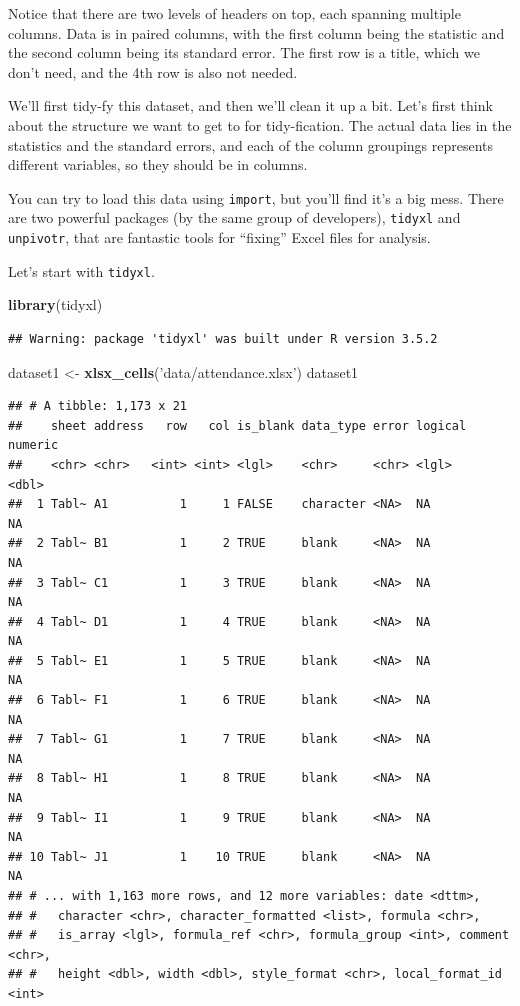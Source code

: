 \documentclass[12pt,letterpaperpaper,openany]{book}
\newenvironment{Shaded}{\begin{snugshade}}{\end{snugshade}}
\newcommand{\KeywordTok}[1]{\textcolor[rgb]{0.13,0.29,0.53}{\textbf{#1}}}
\newcommand{\NormalTok}[1]{#1}
\newcommand{\StringTok}[1]{\textcolor[rgb]{0.31,0.60,0.02}{#1}}
\begin{document}
Notice that there are two levels of headers on top, each spanning multiple columns.
Data is in paired columns, with the first column being the statistic and the second column
being its standard error. The first row is a title, which we don't need, and the
4th row is also not needed.

We'll first tidy-fy this dataset, and then we'll clean it up a bit. Let's first
think about the structure we want to get to for tidy-fication. The actual data lies in
the statistics and the standard errors, and each of the column groupings represents different
variables, so they should be in columns.

You can try to load this data using \texttt{import}, but you'll find it's a big mess.
There are two powerful packages (by the same group of developers), \texttt{tidyxl} and
\texttt{unpivotr}, that are fantastic tools for ``fixing'' Excel files for analysis.

Let's start with \texttt{tidyxl}.

\begin{Shaded}
\begin{Highlighting}[]
\KeywordTok{library}\NormalTok{(tidyxl)}
\end{Highlighting}
\end{Shaded}

\begin{verbatim}
## Warning: package 'tidyxl' was built under R version 3.5.2
\end{verbatim}

\begin{Shaded}
\begin{Highlighting}[]
\NormalTok{dataset1 <-}\StringTok{ }\KeywordTok{xlsx_cells}\NormalTok{(}\StringTok{'data/attendance.xlsx'}\NormalTok{)}
\NormalTok{dataset1}
\end{Highlighting}
\end{Shaded}

\begin{verbatim}
## # A tibble: 1,173 x 21
##    sheet address   row   col is_blank data_type error logical numeric
##    <chr> <chr>   <int> <int> <lgl>    <chr>     <chr> <lgl>     <dbl>
##  1 Tabl~ A1          1     1 FALSE    character <NA>  NA           NA
##  2 Tabl~ B1          1     2 TRUE     blank     <NA>  NA           NA
##  3 Tabl~ C1          1     3 TRUE     blank     <NA>  NA           NA
##  4 Tabl~ D1          1     4 TRUE     blank     <NA>  NA           NA
##  5 Tabl~ E1          1     5 TRUE     blank     <NA>  NA           NA
##  6 Tabl~ F1          1     6 TRUE     blank     <NA>  NA           NA
##  7 Tabl~ G1          1     7 TRUE     blank     <NA>  NA           NA
##  8 Tabl~ H1          1     8 TRUE     blank     <NA>  NA           NA
##  9 Tabl~ I1          1     9 TRUE     blank     <NA>  NA           NA
## 10 Tabl~ J1          1    10 TRUE     blank     <NA>  NA           NA
## # ... with 1,163 more rows, and 12 more variables: date <dttm>,
## #   character <chr>, character_formatted <list>, formula <chr>,
## #   is_array <lgl>, formula_ref <chr>, formula_group <int>, comment <chr>,
## #   height <dbl>, width <dbl>, style_format <chr>, local_format_id <int>
\end{verbatim}
\end{document}
